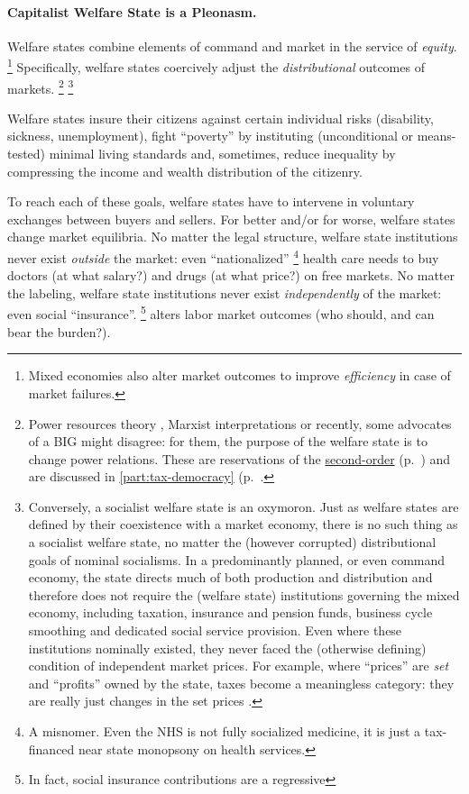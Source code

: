 \paragraph{Capitalist Welfare State is a Pleonasm.}
	\label{sec:interface}
Welfare states combine elements of command and market in the service of \emph{equity}.
\footnote{
	Mixed economies also alter market outcomes to improve \emph{efficiency} in case of market failures.
}
Specifically, welfare states coercively adjust the \emph{distributional} outcomes of markets.
\footnote{
	Power resources theory \citep[for example][]{Korpi2003}, Marxist interpretations \citep[for example][]{Offe1972} or recently, some advocates of a \gls{BIG} might disagree:
	for them, the purpose of the welfare state is to change power relations.
	These are reservations of the \hyperref[sec:epistemology]{second-order} (p.~\pageref{sec:epistemology}) and are discussed in \autoref{part:tax-democracy} (p.~\pageref{part:tax-democracy}.
}
\footnote{
	Conversely, a socialist welfare state is an oxymoron.
	Just as welfare states are defined by their coexistence with a market economy, there is no such thing as a socialist welfare state, no matter the (however corrupted) distributional goals of nominal socialisms.
	In a predominantly planned, or even command economy, the state directs much of both production and distribution and therefore does not require the (welfare state) institutions governing the mixed economy, including taxation, insurance and pension funds, business cycle smoothing and dedicated social service provision.
	Even where these institutions nominally existed, they never faced the (otherwise defining) condition of independent market prices.
	For example, where ``prices'' are \emph{set} and ``profits'' owned by the state, taxes become a meaningless category:
	they are really just changes in the set prices \citep[for example,][23]{Bonker2006}.
}

Welfare states insure their citizens against certain individual risks (disability, sickness, unemployment), fight ``poverty'' by instituting (unconditional or means-tested) minimal living standards and, sometimes, reduce inequality by compressing the income and wealth distribution of the citizenry.

To reach each of these goals, welfare states have to intervene in voluntary exchanges between buyers and sellers.
For better and/or for worse, welfare states change market equilibria.
No matter the legal structure, welfare state institutions never exist \emph{outside} the market:
even ``nationalized''
\footnote{
	A misnomer.
	Even the \gls{NHS} is not fully socialized medicine, it is just a tax-financed near state monopsony on health services.
}
health care needs to buy doctors (at what salary?) and drugs (at what price?) on free markets.
No matter the labeling, welfare state institutions never exist \emph{independently} of the market:
even social ``insurance''.
\footnote{
	In fact, social insurance contributions are a regressive 
}
alters labor market outcomes (who should, and can bear the burden?).

